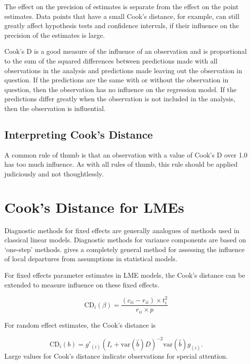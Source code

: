 \documentclass[12pt, a4paper]{article}
\begin{document}
The effect on the precision of estimates is separate from the effect on the point estimates. Data points that
have a small Cook's distance, for example, can still greatly affect hypothesis tests and confidence intervals, if their  influence on the precision of the estimates is large.



	
Cook's D is a good measure of the influence of an observation and is proportional to the sum of the squared differences between predictions made with all observations in the analysis and predictions made leaving out the observation in question. If the predictions are the same with or without the observation in question, then the observation has no influence on the regression model. If the predictions differ greatly when the observation is not included in the analysis, then the observation is influential.

\subsection{Interpreting Cook's Distance}
A common rule of thumb is that an observation with a value of Cook's D over 1.0 has too much influence. As with all rules of thumb, this rule should be applied judiciously and not thoughtlessly.

\section{Cook's Distance for LMEs} %
Diagnostic methods for fixed effects are generally analogues of methods used in classical linear models.
Diagnostic methods for variance components are based on `one-step' methods. \citet{cook86} gives a completely general method for assessing the influence of local departures from assumptions in statistical models.

For fixed effects parameter estimates in LME models, the  Cook's distance can be extended to measure influence on these fixed effects.

\[
\mbox{CD}_{i}(\beta) = \frac{(c_{ii} - r_{ii}) \times t^2_{i}}{r_{ii} \times p}
\]

For random effect estimates, the  Cook's distance is

\[
\mbox{CD}_{i}(b) = g{\prime}_{(i)} (I_{r} + \mbox{var}(\hat{b})D)^{-2}\mbox{var}(\hat{b})g_{(i)}.
\]
Large values for Cook's distance indicate observations for special attention.
\end{document}
